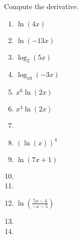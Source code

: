 Compute the derivative. 

\begin{multicols}{2}
\begin{enumerate}[ref={\fcProblemRef}]
\item $\displaystyle \ln(4x)$

\item $\displaystyle \ln(-13 x)$

\item  $\displaystyle\log_2(5 x)$

\item  $\displaystyle\log_{10}(-3 x)$

\item  $\displaystyle x^6\ln(2x)$

\item $\displaystyle x^{4} \ln\left(2 x\right)$

\item  
\item $\displaystyle (\ln{}\left({{x}}\right))^{4} $

\item $\displaystyle \ln{}\left(7 {{x}}+1\right)$

\item 
\item 
\item $\displaystyle \ln{}\left(\frac{5 {{x}}-4}{- {{x}}-5}\right) $

\item 
\item 
\end{enumerate}
\end{multicols}